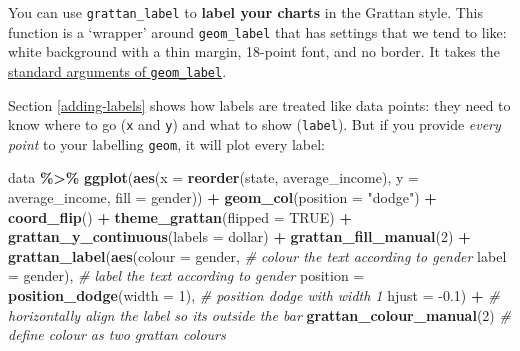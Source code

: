 \documentclass[
]{book}
\newenvironment{Shaded}{\begin{snugshade}}{\end{snugshade}}
\newcommand{\CommentTok}[1]{\textcolor[rgb]{0.56,0.35,0.01}{\textit{#1}}}
\newcommand{\DataTypeTok}[1]{\textcolor[rgb]{0.13,0.29,0.53}{#1}}
\newcommand{\DecValTok}[1]{\textcolor[rgb]{0.00,0.00,0.81}{#1}}
\newcommand{\FloatTok}[1]{\textcolor[rgb]{0.00,0.00,0.81}{#1}}
\newcommand{\KeywordTok}[1]{\textcolor[rgb]{0.13,0.29,0.53}{\textbf{#1}}}
\newcommand{\NormalTok}[1]{#1}
\newcommand{\OperatorTok}[1]{\textcolor[rgb]{0.81,0.36,0.00}{\textbf{#1}}}
\newcommand{\OtherTok}[1]{\textcolor[rgb]{0.56,0.35,0.01}{#1}}
\newcommand{\StringTok}[1]{\textcolor[rgb]{0.31,0.60,0.02}{#1}}
\begin{document}
You can use \texttt{grattan\_label} to \textbf{label your charts} in the Grattan style. This function is a `wrapper' around \texttt{geom\_label} that has settings that we tend to like: white background with a thin margin, 18-point font, and no border. It takes the \href{https://ggplot2.tidyverse.org/reference/geom_text.html}{standard arguments of \texttt{geom\_label}}.

Section \ref{adding-labels} shows how labels are treated like data points: they need to know where to go (\texttt{x} and \texttt{y}) and what to show (\texttt{label}). But if you provide \emph{every point} to your labelling \texttt{geom}, it will plot every label:

\begin{Shaded}
\begin{Highlighting}[]
\NormalTok{data }\OperatorTok{\%\textgreater{}\%}\StringTok{ }
\StringTok{  }\KeywordTok{ggplot}\NormalTok{(}\KeywordTok{aes}\NormalTok{(}\DataTypeTok{x =} \KeywordTok{reorder}\NormalTok{(state, average\_income), }
             \DataTypeTok{y =}\NormalTok{ average\_income,}
             \DataTypeTok{fill =}\NormalTok{ gender)) }\OperatorTok{+}\StringTok{ }
\StringTok{  }\KeywordTok{geom\_col}\NormalTok{(}\DataTypeTok{position =} \StringTok{"dodge"}\NormalTok{) }\OperatorTok{+}\StringTok{ }
\StringTok{  }\KeywordTok{coord\_flip}\NormalTok{() }\OperatorTok{+}\StringTok{ }
\StringTok{  }\KeywordTok{theme\_grattan}\NormalTok{(}\DataTypeTok{flipped =} \OtherTok{TRUE}\NormalTok{) }\OperatorTok{+}\StringTok{ }
\StringTok{  }\KeywordTok{grattan\_y\_continuous}\NormalTok{(}\DataTypeTok{labels =}\NormalTok{ dollar) }\OperatorTok{+}\StringTok{ }
\StringTok{  }\KeywordTok{grattan\_fill\_manual}\NormalTok{(}\DecValTok{2}\NormalTok{) }\OperatorTok{+}\StringTok{ }
\StringTok{  }\KeywordTok{grattan\_label}\NormalTok{(}\KeywordTok{aes}\NormalTok{(}\DataTypeTok{colour =}\NormalTok{ gender,  }\CommentTok{\# colour the text according to gender}
                    \DataTypeTok{label =}\NormalTok{ gender),  }\CommentTok{\# label the text according to gender}
            \DataTypeTok{position =} \KeywordTok{position\_dodge}\NormalTok{(}\DataTypeTok{width =} \DecValTok{1}\NormalTok{),  }\CommentTok{\# position dodge with width 1}
            \DataTypeTok{hjust =} \FloatTok{{-}0.1}\NormalTok{) }\OperatorTok{+}\StringTok{  }\CommentTok{\# horizontally align the label so its outside the bar}
\StringTok{  }\KeywordTok{grattan\_colour\_manual}\NormalTok{(}\DecValTok{2}\NormalTok{)   }\CommentTok{\# define colour as two grattan colours}
\end{Highlighting}
\end{Shaded}
\end{document}
